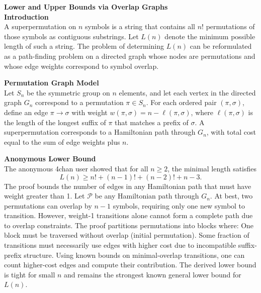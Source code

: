 \begin{technical}
{\Large\textbf{Lower and Upper Bounds via Overlap Graphs}}\\

\noindent\textbf{Introduction}\\
A superpermutation on $n$ symbols is a string that contains all $n!$ permutations of those symbols as contiguous substrings. Let $L(n)$ denote the minimum possible length of such a string. The problem of determining $L(n)$ can be reformulated as a path-finding problem on a directed graph whose nodes are permutations and whose edge weights correspond to symbol overlap.

\noindent\textbf{Permutation Graph Model}\\
Let $S_n$ be the symmetric group on $n$ elements, and let each vertex in the directed graph $G_n$ correspond to a permutation $\pi \in S_n$. For each ordered pair $(\pi, \sigma)$, define an edge $\pi \rightarrow \sigma$ with weight $w(\pi, \sigma) = n - \ell(\pi, \sigma)$, where $\ell(\pi, \sigma)$ is the length of the longest suffix of $\pi$ that matches a prefix of $\sigma$. A superpermutation corresponds to a Hamiltonian path through $G_n$, with total cost equal to the sum of edge weights plus $n$.

\noindent\textbf{Anonymous Lower Bound}\\
The anonymous 4chan user showed that for all $n \geq 2$, the minimal length satisfies
\[
L(n) \geq n! + (n-1)! + (n-2)! + n - 3.
\]
The proof bounds the number of edges in any Hamiltonian path that must have weight greater than 1. Let $\mathcal{P}$ be any Hamiltonian path through $G_n$. At best, two permutations can overlap by $n-1$ symbols, requiring only one new symbol to transition. However, weight-1 transitions alone cannot form a complete path due to overlap constraints. The proof partitions permutations into blocks where: One block must be traversed without overlap (initial permutation). Some fraction of transitions must necessarily use edges with higher cost due to incompatible suffix-prefix structure. Using known bounds on minimal-overlap transitions, one can count higher-cost edges and compute their contribution.
The derived lower bound is tight for small $n$ and remains the strongest known general lower bound for $L(n)$.


\end{technical}
